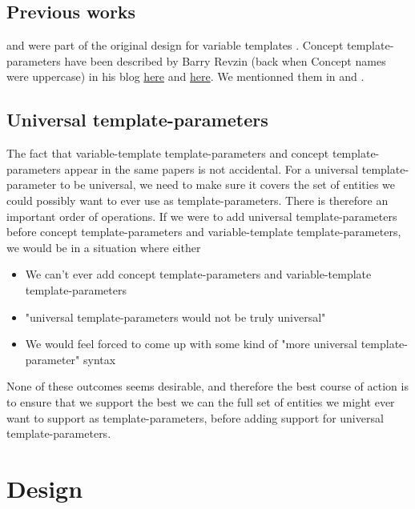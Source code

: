 \documentclass{wg21}
\begin{document}

\subsection{Previous works}

and were part of the original design for variable templates .
Concept template-parameters have been described by Barry Revzin (back when Concept names were uppercase) in his blog \href{https://brevzin.github.io/c++/2019/01/09/concept-templates/}{here} and \href{https://brevzin.github.io/c++/2019/03/24/concept-templates-2/}{here}.
We mentionned them in  and .

\subsection{Universal template-parameters}

The fact that variable-template template-parameters and concept template-parameters appear in the same papers is not accidental.
For a universal template-parameter to be universal, we need to make sure it covers the set of entities we could possibly want to ever use as template-parameters.
There is therefore an important order of operations.
If we were to add universal template-parameters before concept template-parameters and variable-template template-parameters, we would be in a situation where either
\begin{itemize}
\item We can't ever add concept template-parameters and variable-template template-parameters
\item "universal template-parameters would not be truly universal"
\item We would feel forced to come up with some kind of "more universal template-parameter" syntax
\end{itemize}

None of these outcomes seems desirable, and therefore the best course of action is to ensure that we
support the best we can the full set of entities we might ever want to support as template-parameters, before adding support for universal template-parameters.

\section{Design}

%
\end{document}
